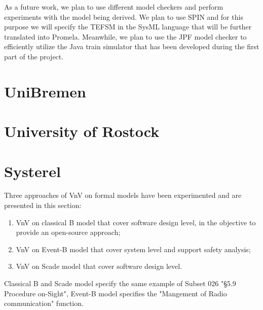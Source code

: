\documentclass{template/openetcs_article}
\begin{document}
As a future work, we plan to use different model checkers and perform experiments with the model being derived. We plan to use SPIN and for this purpose we will specify the TEFSM in the SysML language that will be further translated into Promela. Meanwhile, we plan to use the JPF model checker to efficiently utilize the Java train simulator that has been developed during the first part of the project.

\newpage



\newpage

\section{UniBremen}



\newpage

\section{University of Rostock }



\newpage

\section{Systerel}

Three approaches of VnV  on formal models have been experimented and are presented in this section:

\begin{enumerate}
\item VnV on classical B  model that cover software design level, in the objective to provide an open-source approach;
\item VnV on Event-B model that cover system level and support safety analysis;
\item VnV on Scade model that cover software design level.
\end{enumerate}

Classical B and Scade model specify the same example of Subset 026 "§5.9 Procedure on-Sight", Event-B model specifies the "Mangement of Radio communication" function.









\nocite{*}

%



%
\end{document}
